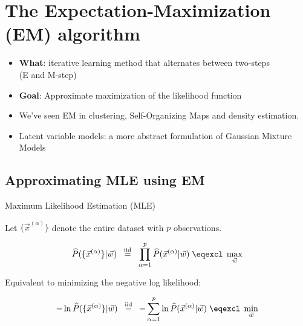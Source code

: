 \section{The Expectation-Maximization (EM) algorithm}

\begin{frame} 
    \begin{itemize}
       \item \textbf{What}: iterative learning method that alternates between two-steps\\ (E and M-step)\\
       \item \textbf{Goal}: Approximate maximization of the likelihood function
    \end{itemize}
	
\end{frame}

\begin{frame}{\secname}
    \begin{itemize}
		\item We've seen EM in clustering, Self-Organizing Maps and density estimation.
	   \item Latent variable models: a more abstract formulation of Gaussian Mixture Models
    \end{itemize}
\end{frame}

\subsection{Approximating MLE using EM}

\begin{frame}{Maximum Likelihood Estimation (MLE)}

Let $\{ \vec x^{(\alpha)}\}$ denote the entire dataset with $p$ observations.

    \begin{equation}
		\widehat P(\{ \vec x^{(\alpha)} \} | \vec w) \;\; \stackrel{\text{iid}}{=} \;\; \prod_{\alpha=1}^p \widehat P(\vec x^{(\alpha)} | \vec w) \; \eqexcl \; \max_{\vec w}
    \end{equation}
    
Equivalent to minimizing the negative log likelihood:

    \begin{equation}
    - \ln \widehat P(\{ \vec x^{(\alpha)} \} | \vec w) \;\; \stackrel{\text{iid}}{=} \;\; 
		- \sum_{\alpha=1}^p \ln \widehat P(\vec x^{(\alpha)} | \vec w) \; \eqexcl \; \min_{\vec w}
    \end{equation}

	
\end{frame}

